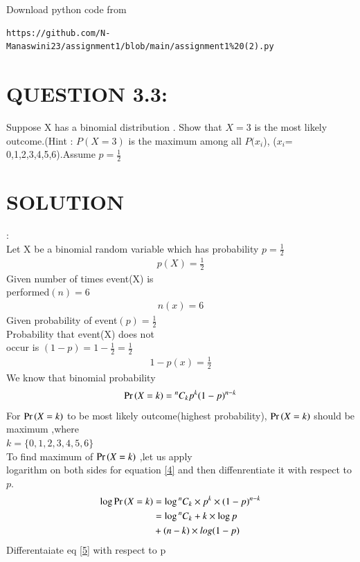 \documentclass[journal,12pt,twocolumn]{IEEEtran}
\newcommand*{\Comb}[2]{{}^{#1}C_{#2}}%
\begin{document}
\renewcommand{\thefigure}{\theenumi}
\renewcommand{\thetable}{\theenumi}

Download python code from 
\begin{lstlisting}
https://github.com/N-Manaswini23/assignment1/blob/main/assignment1%20(2).py
\end{lstlisting}
%



\section*{ QUESTION 3.3:}
Suppose X has a binomial
 distribution . Show that $X = 3$ is the most likely outcome.(Hint : $P(X = 3)$ is the maximum among all $P(x_i$), ($x_i$= 0,1,2,3,4,5,6).Assume $p=\frac{1}{2}$ 
 \\
\section*{SOLUTION}:\\
Let X be a binomial random variable which has probability  $p=\frac{1}{2}$ 
 \begin{align}
p(X)=\frac{1}{2} \label{1}
 \end{align}
Given number of times event(X) is\\
 performed$(n)=6$
 \begin{align}
 n(x)=6 \label{2}
 \end{align}
Given probability of event$(p)= \frac{1}{2}$\\
Probability that event(X) does not \\occur is
$(1-p)=1-\frac{1}{2}=\frac{1}{2} $
 \begin{align}
1-p(x)=\frac{1}{2}\label{3}
 \end{align}
We know that binomial probability
\begin{align}
\pr{X=k} = \Comb{n}{k} p^k({1-p})^{n-k}  \label{4} 
\end{align}
For $\Pr\left(X=k\right)$ to be most likely outcome(highest probability),
 $\Pr\left(X=k\right)$  should be maximum ,where\\
$ k=\{0,1,2,3,4,5,6\}$\\
To find maximum of  $\Pr\left(X=k\right)$  ,let us  apply \\logarithm on both sides for equation \eqref{4} and then diffenrentiate it with respect
to $p$.
\begin{align}
\log  \pr{X=k} &=\log  \Comb{n}{k} \times p^k\times ({1-p})^{n-k} \\
&=\log \Comb{n}{k} +k \times \log p \notag \\
 &+(n-k)\times log (1-p) \label{5}
\end{align}
Differentaiate eq \eqref{5} with respect to p
\end{document}
